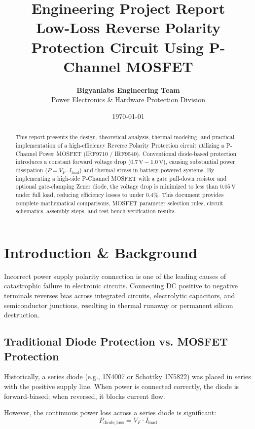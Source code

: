\documentclass[11pt,a4paper]{article}
\title{\textbf{\Huge Engineering Project Report}\\[0.5em] \Large Low-Loss Reverse Polarity Protection Circuit Using P-Channel MOSFET}
\author{\textbf{Bigyanlabs Engineering Team}\\ Power Electronics \& Hardware Protection Division}
\date{\today}
\begin{document}
\maketitle
\thispagestyle{empty}

\begin{abstract}
This report presents the design, theoretical analysis, thermal modeling, and practical implementation of a high-efficiency Reverse Polarity Protection circuit utilizing a P-Channel Power MOSFET (IRF9710 / IRF9540). Conventional diode-based protection introduces a constant forward voltage drop ($0.7\,\text{V} - 1.0\,\text{V}$), causing substantial power dissipation ($P = V_F \cdot I_{\text{load}}$) and thermal stress in battery-powered systems. By implementing a high-side P-Channel MOSFET with a gate pull-down resistor and optional gate-clamping Zener diode, the voltage drop is minimized to less than $0.05\,\text{V}$ under full load, reducing efficiency losses to under $0.4\%$. This document provides complete mathematical comparisons, MOSFET parameter selection rules, circuit schematics, assembly steps, and test bench verification results.
\end{abstract}

\newpage
\tableofcontents
\newpage

\section{Introduction \& Background}
Incorrect power supply polarity connection is one of the leading causes of catastrophic failure in electronic circuits. Connecting DC positive to negative terminals reverses bias across integrated circuits, electrolytic capacitors, and semiconductor junctions, resulting in thermal runaway or permanent silicon destruction.

\subsection{Traditional Diode Protection vs. MOSFET Protection}
Historically, a series diode (e.g., 1N4007 or Schottky 1N5822) was placed in series with the positive supply line. When power is connected correctly, the diode is forward-biased; when reversed, it blocks current flow.

However, the continuous power loss across a series diode is significant:
\begin{equation}
P_{\text{diode\_loss}} = V_F \cdot I_{\text{load}}
\end{equation}
\end{document}
